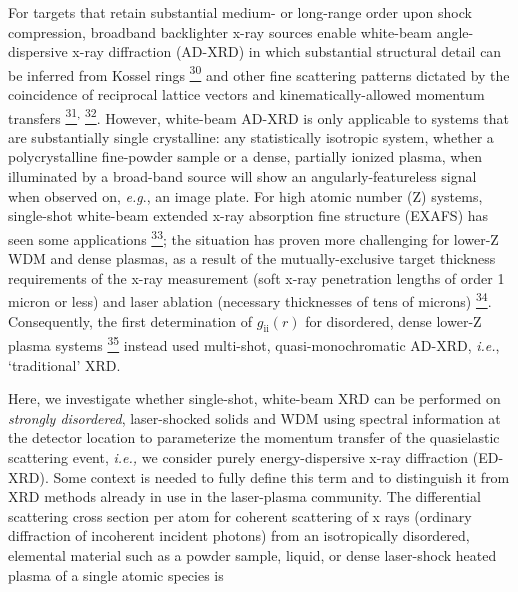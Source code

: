 For targets that retain substantial medium- or long-range order upon
shock compression, broadband backlighter x-ray sources enable white-beam
angle-dispersive x-ray diffraction (AD-XRD) in which substantial
structural detail can be inferred from Kossel rings
\hyperref[v.-lider-crystallography-reports-56-169-2011.]{\textsuperscript{30}}
and other fine scattering patterns dictated by the coincidence of
reciprocal lattice vectors and kinematically-allowed momentum transfers
\hyperref[m.-suggit-g.-kimminau-j.-hawreliak-b.-remington-n.-park-and-j.-wark-review-of-scientific-instruments-81-083902-2010.]{\textsuperscript{31}}\textsuperscript{,}
\hyperref[m.-j.-suggit-et-al.-nature-communications-3-1224-2012.]{\textsuperscript{32}}.
However, white-beam AD-XRD is only applicable to systems that are
substantially single crystalline: any statistically isotropic system,
whether a polycrystalline fine-powder sample or a dense, partially
ionized plasma, when illuminated by a broad-band source will show an
angularly-featureless signal when observed on, \emph{e.g}., an image
plate. For high atomic number (Z) systems, single-shot white-beam
extended x-ray absorption fine structure (EXAFS) has seen some
applications
\hyperref[b.-yaakobi-t.-r.-boehly-d.-d.-meyerhofer-t.-j.-b.-collins-b.-a.-remington-p.-g.-allen-s.-m.-pollaine-h.-e.-lorenzana-and-j.-h.-eggert-physical-review-letters-95-075501-2005.]{\textsuperscript{33}};
the situation has proven more challenging for lower-Z WDM and dense
plasmas, as a result of the mutually-exclusive target thickness
requirements of the x-ray measurement (soft x-ray penetration lengths of
order 1 micron or less) and laser ablation (necessary thicknesses of
tens of microns)
\hyperref[j.-l.-bourgade-et-al.-review-of-scientific-instruments-75-4204-2004.]{\textsuperscript{34}}.
Consequently, the first determination of
\(g_{\text{ii}}\left( r \right)\) for disordered, dense lower-Z plasma
systems
\hyperref[t.-ma-et-al.-physical-review-letters-110-065001-2013.]{\textsuperscript{35}}
instead used multi-shot, quasi-monochromatic AD-XRD, \emph{i.e.},
`traditional' XRD.

Here, we investigate whether single-shot, white-beam XRD can be
performed on \emph{strongly disordered}, laser-shocked solids and WDM
using spectral information at the detector location to parameterize the
momentum transfer of the quasielastic scattering event, \emph{i.e.,} we
consider purely energy-dispersive x-ray diffraction (ED-XRD). Some
context is needed to fully define this term and to distinguish it from
XRD methods already in use in the laser-plasma community. The
differential scattering cross section per atom for coherent scattering
of x rays (ordinary diffraction of incoherent incident photons) from an
isotropically disordered, elemental material such as a powder sample,
liquid, or dense laser-shock heated plasma of a single atomic species is


